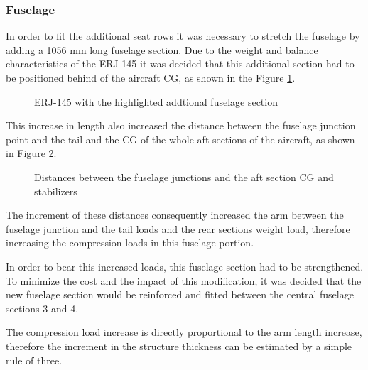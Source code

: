 \subsubsection{Fuselage}

In order to fit the additional seat rows it was necessary to stretch the fuselage by adding a 1056 mm long fuselage section. Due to the weight and balance characteristics of the ERJ-145 it was decided that this additional section had to be positioned behind of the aircraft CG, as shown in the Figure \ref{fig:fig4_Addtional_fuselage_section}.

\begin{figure}[H] %
\caption{ERJ-145 with the highlighted addtional fuselage section}
\label{fig:fig4_Addtional_fuselage_section}
\end{figure}

This increase in length also increased the distance between the fuselage junction point and the tail and the CG of the whole aft sections of the aircraft, as shown in Figure \ref{fig:fig5_Distances_between_fuselage}.

\begin{figure}[H] %
\caption{Distances between the fuselage junctions and the aft section CG and stabilizers}
\label{fig:fig5_Distances_between_fuselage}
\end{figure}

The increment of these distances consequently increased the arm between the fuselage junction and the tail loads and the rear sections weight load, therefore increasing the compression loads in this fuselage portion.

In order to bear this increased loads, this fuselage section had to be strengthened. To minimize the cost and the impact of this modification, it was decided that the new fuselage section would be reinforced and fitted between the central fuselage sections 3 and 4.

The compression load increase is directly proportional to the arm length increase, therefore the increment in the structure thickness can be estimated by a simple rule of three.

